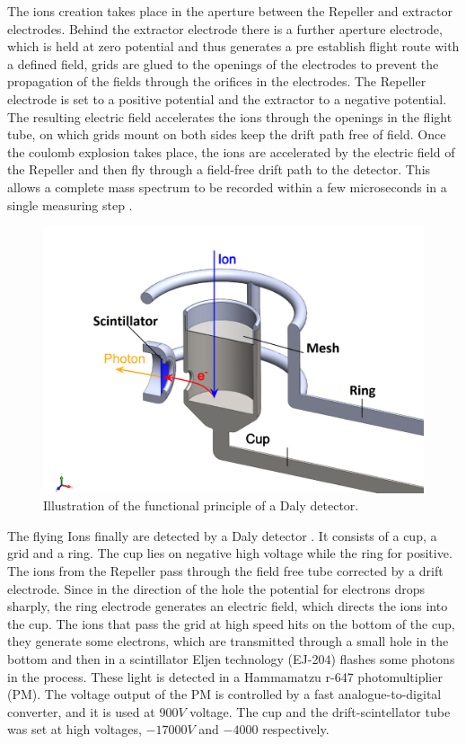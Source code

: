 The ions creation takes place in the aperture between the Repeller and extractor electrodes. Behind the extractor electrode there is a further aperture electrode, which is held at zero potential and thus generates a pre establish flight route with a defined field, grids are glued to the openings of the electrodes to prevent the propagation of the fields through the orifices in the electrodes. The Repeller electrode is set to a positive potential and the extractor to a negative potential. The resulting electric field accelerates the ions through the openings in the flight tube, on which grids mount on both sides keep the drift path free of field.
Once the coulomb explosion takes place, the ions are accelerated by the electric field of the Repeller and then fly through a field-free drift path to the detector. This allows a complete mass spectrum to be recorded within a few microseconds in a single measuring step \cite{mobius_time--flight_2016}.

\begin{figure}[hbtp]
\label{img:tofcup}
\centering
\includegraphics[width = 10 cm]{../Images/Cup scintillator.png}
\caption[TOF cup]{Illustration of the functional principle of a Daly detector.}
\end{figure}

The flying Ions finally are detected by a Daly detector \cite{daly_scintillation_1960}. It consists of a cup, a grid and a ring. The cup lies on negative high voltage while the ring for positive. The ions from the Repeller pass through the field free tube corrected by a drift electrode.  Since in the direction of the hole the potential for electrons drops sharply, the ring electrode generates an electric field, which directs the ions into the cup. The ions that pass the grid at high speed hits on the bottom of the cup, they generate some electrons, which are transmitted through a small hole in the bottom and then in a scintillator Eljen technology (EJ-204) flashes some photons in the process. These light is detected in a Hammamatzu r-647 photomultiplier (PM). The voltage output of the PM is controlled by a fast analogue-to-digital converter, and it is used at $900V$ voltage. The cup and the drift-scintellator  tube was set at high voltages,  $-17000V$ and $-4000$ respectively.

